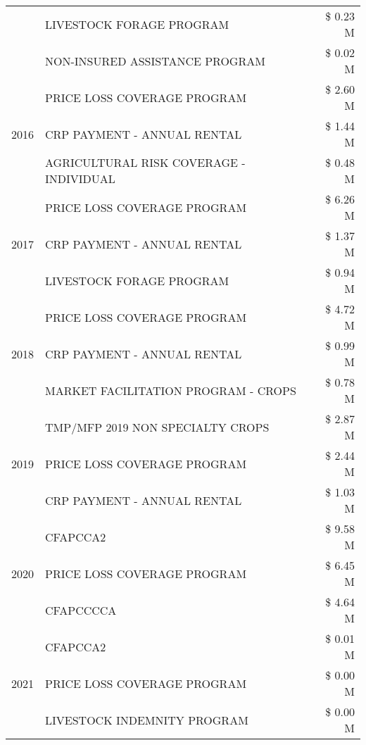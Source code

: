 \begin{tabular}{llr}
 & LIVESTOCK FORAGE PROGRAM & \$ 0.23 M \\
 & NON-INSURED ASSISTANCE PROGRAM & \$ 0.02 M \\
\cline{1-3}
\multirow[t]{3}{*}{2016} & PRICE LOSS COVERAGE PROGRAM & \$ 2.60 M \\
 & CRP PAYMENT - ANNUAL RENTAL & \$ 1.44 M \\
 & AGRICULTURAL RISK COVERAGE - INDIVIDUAL & \$ 0.48 M \\
\cline{1-3}
\multirow[t]{3}{*}{2017} & PRICE LOSS COVERAGE PROGRAM & \$ 6.26 M \\
 & CRP PAYMENT - ANNUAL RENTAL & \$ 1.37 M \\
 & LIVESTOCK FORAGE PROGRAM & \$ 0.94 M \\
\cline{1-3}
\multirow[t]{3}{*}{2018} & PRICE LOSS COVERAGE PROGRAM & \$ 4.72 M \\
 & CRP PAYMENT - ANNUAL RENTAL & \$ 0.99 M \\
 & MARKET FACILITATION PROGRAM - CROPS & \$ 0.78 M \\
\cline{1-3}
\multirow[t]{3}{*}{2019} & TMP/MFP 2019 NON SPECIALTY CROPS & \$ 2.87 M \\
 & PRICE LOSS COVERAGE PROGRAM & \$ 2.44 M \\
 & CRP PAYMENT - ANNUAL RENTAL & \$ 1.03 M \\
\cline{1-3}
\multirow[t]{3}{*}{2020} & CFAPCCA2 & \$ 9.58 M \\
 & PRICE LOSS COVERAGE PROGRAM & \$ 6.45 M \\
 & CFAPCCCCA & \$ 4.64 M \\
\cline{1-3}
\multirow[t]{3}{*}{2021} & CFAPCCA2 & \$ 0.01 M \\
 & PRICE LOSS COVERAGE PROGRAM & \$ 0.00 M \\
 & LIVESTOCK INDEMNITY PROGRAM & \$ 0.00 M \\
\cline{1-3}
\bottomrule
\end{tabular}
